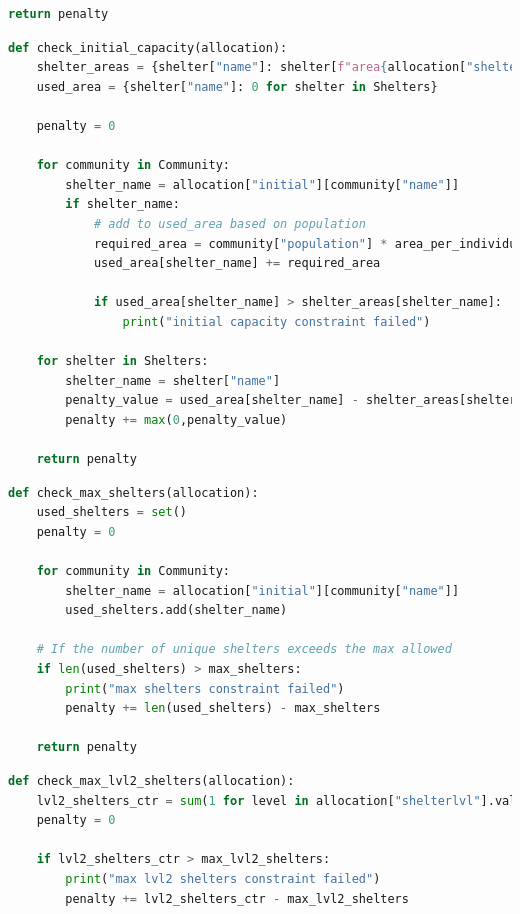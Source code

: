 \begin{appendices}
\begin{centerappendixtitle}
\begin{lstlisting}[language=Python,caption={Maximum Distance Constraint}, label={maxdistCode}]
    return penalty
\end{lstlisting}

\pagebreak
\begin{lstlisting}[language=Python,caption={Capacity Constraint}, label={capCode}]
def check_initial_capacity(allocation):
    shelter_areas = {shelter["name"]: shelter[f"area{allocation["shelterlvl"][shelter['name']]}"] for shelter in Shelters}
    used_area = {shelter["name"]: 0 for shelter in Shelters}

    penalty = 0

    for community in Community:
        shelter_name = allocation["initial"][community["name"]]
        if shelter_name:
            # add to used_area based on population
            required_area = community["population"] * area_per_individual
            used_area[shelter_name] += required_area

            if used_area[shelter_name] > shelter_areas[shelter_name]:
                print("initial capacity constraint failed")

    for shelter in Shelters:
        shelter_name = shelter["name"]
        penalty_value = used_area[shelter_name] - shelter_areas[shelter_name]
        penalty += max(0,penalty_value)

    return penalty
\end{lstlisting}

\begin{lstlisting}[language=Python,caption={Maximum Shelter Constraint}, label={maxshelCode}]
def check_max_shelters(allocation):
    used_shelters = set() 
    penalty = 0

    for community in Community:
        shelter_name = allocation["initial"][community["name"]]
        used_shelters.add(shelter_name)  

    # If the number of unique shelters exceeds the max allowed
    if len(used_shelters) > max_shelters:
        print("max shelters constraint failed")
        penalty += len(used_shelters) - max_shelters
            
    return penalty
\end{lstlisting}

\pagebreak
\begin{lstlisting}[language=Python,caption={Maximum Level 2 Shelter Constraint}, label={maxl2shelCode}]
def check_max_lvl2_shelters(allocation):
    lvl2_shelters_ctr = sum(1 for level in allocation["shelterlvl"].values() if level == 2)
    penalty = 0

    if lvl2_shelters_ctr > max_lvl2_shelters:
        print("max lvl2 shelters constraint failed")
        penalty += lvl2_shelters_ctr - max_lvl2_shelters 


\end{lstlisting}
\end{centerappendixtitle}
\end{appendices}

